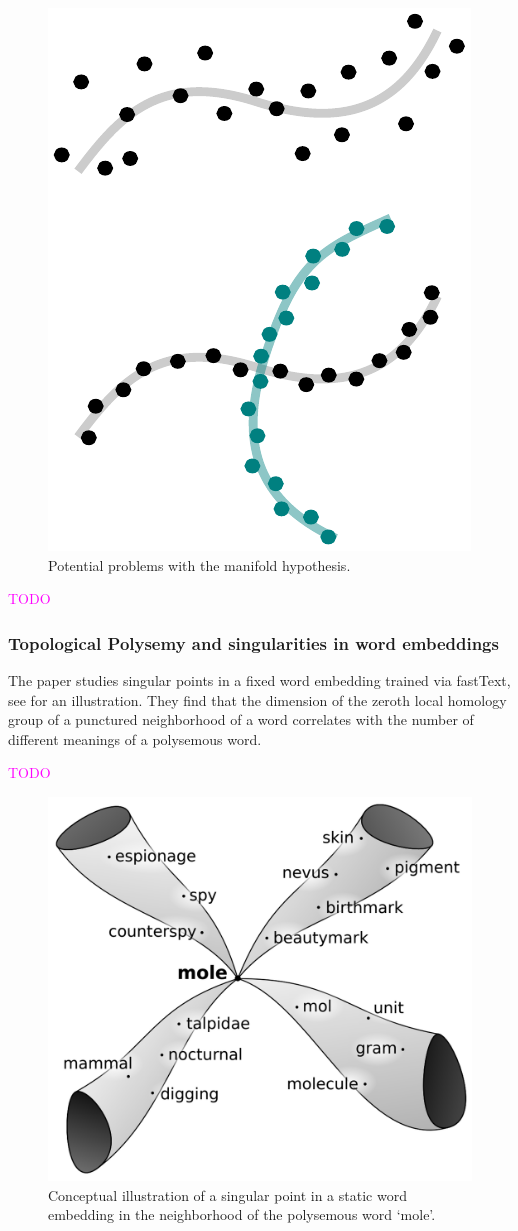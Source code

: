 \documentclass[11pt, a4paper]{amsart}
\begin{document}

\begin{figure}
	\centering
	\includegraphics[width=0.35\linewidth]{figures/topological_data_analysis/manifold_hypothesis_problems.pdf}
	\caption{
		Potential problems with the manifold hypothesis.
		\label{fig:manifold_hypothesis_problems}
	}
\end{figure}

\textcolor{magenta}{TODO}

\subsubsection{Topological Polysemy and singularities in word embeddings}

The paper \cite{jakubowski2020topology} studies singular points in a fixed word embedding trained via fastText, see  for an illustration.
They find that the dimension of the zeroth local homology group of a punctured neighborhood of a word correlates with the number of different meanings of a polysemous word.

\textcolor{magenta}{TODO}

\begin{figure}
	\centering
	\includegraphics[width=0.35\linewidth]{figures/topological_data_analysis/TPS_paper_screenshot}
	\caption{
		Conceptual illustration of a singular point in a static word embedding in the neighborhood of the polysemous word `mole'.
		\label{fig:TPS_paper_screenshot}
	}
\end{figure}



\newpage
\printbibliography
\end{document}
